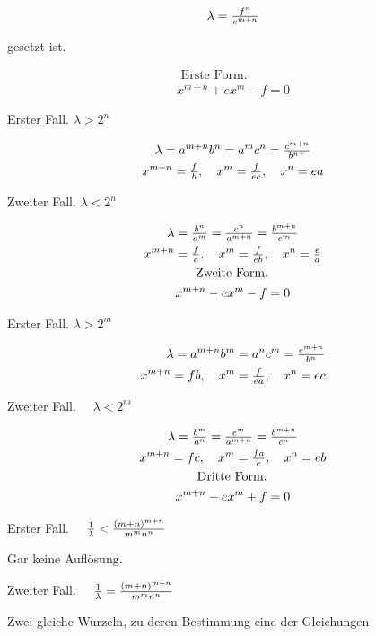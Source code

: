 \documentclass[twoside,12pt, showframe]{memoir}
\let\oldfrac\frac
\def\frac#1#2{\mathchoice{\tfrac{#1}{#2}}{\oldfrac{#1}{#2}}{\genfrac{}{}{}{2}{#1}{#2\mathstrut}}{\genfrac{}{}{}{3}{#1}{#2\mathstrut}}}
\begin{document}
\[
\lambda=\frac{f^{n}}{e^{m+n}}
\]

gesetzt ist.

\[
\begin{gathered}
\text { Erste Form. } \\
x^{m+n}+e x^{m}-f=0
\end{gathered}
\]

Erster Fall. \(\lambda>2^{n}\)

\[
\begin{gathered}
\lambda=a^{m+n} b^{n}=a^{m} c^{n}=\frac{c^{m+n}}{b^{n+}} \\
x^{m+n}=\frac{f}{b}, \quad x^{m}=\frac{f}{e c}, \quad x^{n}=e a
\end{gathered}
\]

Zweiter Fall. \(\lambda<2^{n}\)

\[
\begin{gathered}
\lambda=\frac{b^{n}}{a^{m}}=\frac{c^{n}}{a^{m+n}}=\frac{b^{m+n}}{c^{m}} \\
x^{m+n}=\frac{f}{c}, \quad x^{m}=\frac{f}{e b}, \quad x^{n}=\frac{e}{a} \\
\text { Zweite Form. } \\
x^{m+n}-e x^{m}-f=0
\end{gathered}
\]

Erster Fall. \(\lambda>2^{m}\)

\[
\begin{aligned}
\lambda=a^{m+n} b^{m} & =a^{n} c^{m}=\frac{e^{m+n}}{b^{n}} \\
x^{m+n}=f b, \quad x^{m} & =\frac{f}{e a}, \quad x^{n}=e c
\end{aligned}
\]

Zweiter Fall. \(\quad \lambda<2^{m}\)

\[
\begin{gathered}
\lambda=\frac{b^{m}}{a^{n}}=\frac{e^{m}}{a^{m+n}}=\frac{b^{m+n}}{c^{n}} \\
x^{m+n}=f c, \quad x^{m}=\frac{f a}{e}, \quad x^{n}=e b \\
\text { Dritte Form. } \\
x^{m+n}-e x^{m}+f=0
\end{gathered}
\]

Erster Fall. \(\quad \frac{1}{\lambda}<\frac{(m+n)^{m+n}}{m^{m} n^{n}}\)

Gar keine Auflösung.

Zweiter Fall. \(\quad \frac{1}{\lambda}=\frac{(m+n)^{m+n}}{m^{m} n^{n}}\)

Zwei gleiche Wurzeln, zu deren Bestimmung eine der Gleichungen
\end{document}
